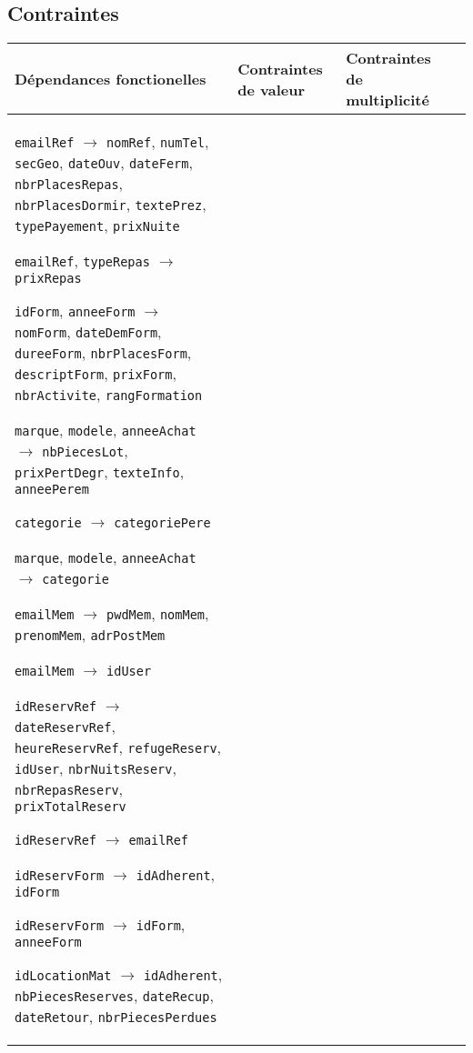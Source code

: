 \documentclass[12pt, a4paper]{article}
\newcommand\att[1]{\textnhtt{#1}}
\begin{document}
\subsection*{Contraintes}
\begin{table}[H]
  \tiny
  \begin{adjustbox}{center}
\begin{tabularx}{0.98\paperwidth}{>{\raggedright}XXXX}
\textbf{Dépendances fonctionelles}
& \textbf{Contraintes de valeur}
& \textbf{Contraintes de multiplicité} \\
\midrule
\att{emailRef}
$\rightarrow$
\att{nomRef},
\att{numTel},
\att{secGeo},
\att{dateOuv},
\att{dateFerm},
\att{nbrPlacesRepas},
\att{nbrPlacesDormir},
\att{textePrez},
\att{typePayement},
\att{prixNuite}

\att{emailRef},
\att{typeRepas}
$\rightarrow$
\att{prixRepas}

\att{idForm},
\att{anneeForm}
$\rightarrow$
\att{nomForm},
\att{dateDemForm},
\att{dureeForm},
\att{nbrPlacesForm},
\att{descriptForm},
\att{prixForm},
\att{nbrActivite},
\att{rangFormation}

\att{marque},
\att{modele},
\att{anneeAchat}
$\rightarrow$
\att{nbPiecesLot},
\att{prixPertDegr},
\att{texteInfo},
\att{anneePerem}

\att{categorie}
$\rightarrow$
\att{categoriePere}

\att{marque},
\att{modele},
\att{anneeAchat}
$\rightarrow$
\att{categorie}

\att{emailMem}
$\rightarrow$
\att{pwdMem},
\att{nomMem},
\att{prenomMem},
\att{adrPostMem}

\att{emailMem}
$\rightarrow$
\att{idUser}

\att{idReservRef}
$\rightarrow$
\att{dateReservRef},
\att{heureReservRef},
\att{refugeReserv},
\att{idUser},
\att{nbrNuitsReserv},
\att{nbrRepasReserv},
\att{prixTotalReserv}

\att{idReservRef}
$\rightarrow$
\att{emailRef}

\att{idReservForm}
$\rightarrow$
\att{idAdherent},
\att{idForm}

\att{idReservForm}
$\rightarrow$
\att{idForm},
\att{anneeForm}

\att{idLocationMat}
$\rightarrow$
\att{idAdherent},
\att{nbPiecesReserves},
\att{dateRecup},
\att{dateRetour},
\att{nbrPiecesPerdues}


\end{tabularx}
\end{adjustbox}
\end{table}
\end{document}
